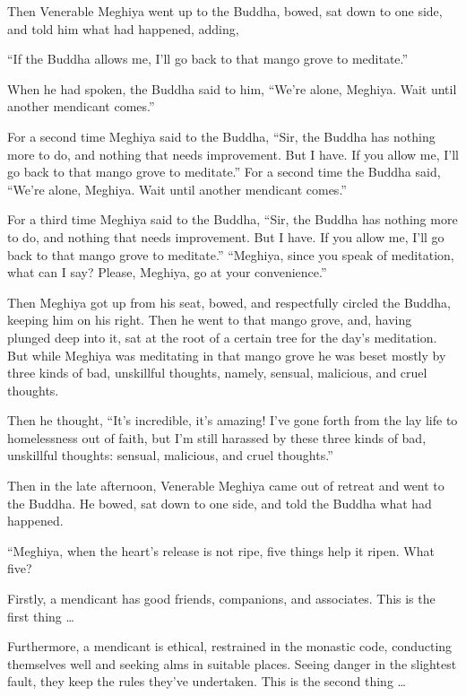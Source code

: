 \documentclass[12pt,openany]{book}%
\begin{document}
Then Venerable Meghiya went up to the Buddha, bowed, sat down to one side, and told him what had happened, adding, 

“If the Buddha allows me, I’ll go back to that mango grove to meditate.” 

When he had spoken, the Buddha said to him, “We’re alone, Meghiya. Wait until another mendicant comes.” 

For a second time Meghiya said to the Buddha, “Sir, the Buddha has nothing more to do, and nothing that needs improvement. But I have. If you allow me, I’ll go back to that mango grove to meditate.” For a second time the Buddha said, “We’re alone, Meghiya. Wait until another mendicant comes.” 

For a third time Meghiya said to the Buddha, “Sir, the Buddha has nothing more to do, and nothing that needs improvement. But I have. If you allow me, I’ll go back to that mango grove to meditate.” “Meghiya, since you speak of meditation, what can I say? Please, Meghiya, go at your convenience.” 

Then Meghiya got up from his seat, bowed, and respectfully circled the Buddha, keeping him on his right. Then he went to that mango grove, and, having plunged deep into it, sat at the root of a certain tree for the day’s meditation. But while Meghiya was meditating in that mango grove he was beset mostly by three kinds of bad, unskillful thoughts, namely, sensual, malicious, and cruel thoughts. 

Then he thought, “It’s incredible, it’s amazing! I’ve gone forth from the lay life to homelessness out of faith, but I’m still harassed by these three kinds of bad, unskillful thoughts: sensual, malicious, and cruel thoughts.” 

Then in the late afternoon, Venerable Meghiya came out of retreat and went to the Buddha. He bowed, sat down to one side, and told the Buddha what had happened. 

“Meghiya, when the heart’s release is not ripe, five things help it ripen. What five? 

Firstly, a mendicant has good friends, companions, and associates. This is the first thing … 

Furthermore, a mendicant is ethical, restrained in the monastic code, conducting themselves well and seeking alms in suitable places. Seeing danger in the slightest fault, they keep the rules they’ve undertaken. This is the second thing … 
\end{document}
